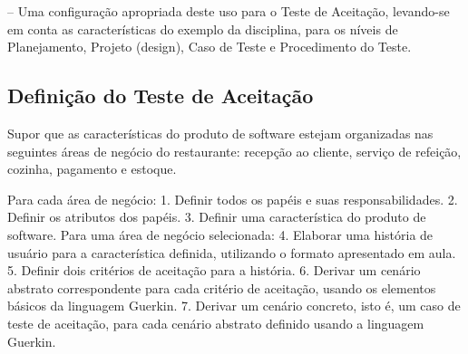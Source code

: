 – Uma configuração apropriada deste uso para o Teste de
Aceitação, levando-se em conta as características do exemplo
da disciplina, para os níveis de Planejamento, Projeto (design),
Caso de Teste e Procedimento do Teste.

\subsection{Definição do Teste de Aceitação}

Supor que as características do produto de software
estejam organizadas nas seguintes áreas de negócio do
restaurante: recepção ao cliente, serviço de refeição,
cozinha, pagamento e estoque.

Para cada área de negócio:
1. Definir todos os papéis e suas responsabilidades.
2. Definir os atributos dos papéis.
3. Definir uma característica do produto de software.
Para uma área de negócio selecionada:
4. Elaborar uma história de usuário para a característica definida,
utilizando o formato apresentado em aula.
5. Definir dois critérios de aceitação para a história.
6. Derivar um cenário abstrato correspondente para cada critério de
aceitação, usando os elementos básicos da linguagem Guerkin.
7. Derivar um cenário concreto, isto é, um caso de teste de aceitação, para
cada cenário abstrato definido usando a linguagem Guerkin.












